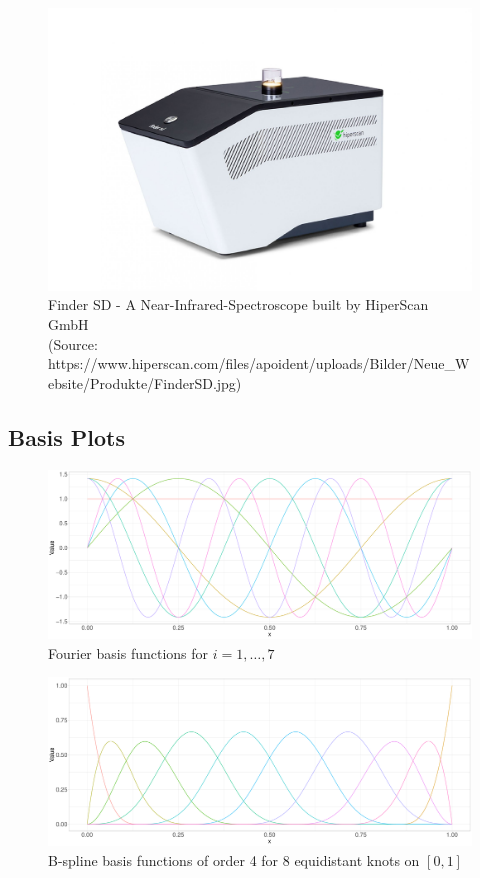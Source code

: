 \documentclass[11pt,twoside,a4paper]{article}
\begin{document}
	\begin{figure}[H]
		\begin{center}
			\includegraphics[width = \textwidth]{../Graphics/FinderSD.jpg}
			\caption{Finder SD - A Near-Infrared-Spectroscope built by HiperScan GmbH \\
			(Source: https://www.hiperscan.com/files/apoident/uploads/Bilder/Neue\_Website/Produkte/FinderSD.jpg)}
		\end{center}
	\end{figure}

	\newpage
	
	\subsection{Basis Plots}\label{Basis_Plots}
	
	\begin{figure}[H]\label{Fourier_basis}
		\includegraphics[width = \textwidth]{../Graphics/Fourier_Basis.pdf}
		\caption{Fourier basis functions for $i = 1,\dots,7$}
	\end{figure}
	
	\begin{figure}[H]\label{B-spline_basis}
		\includegraphics[width = \textwidth]{../Graphics/Bspline_Basis.pdf}
		\caption{B-spline basis functions of order 4 for 8 equidistant knots on $[0,1]$}
	\end{figure}
\end{document}
